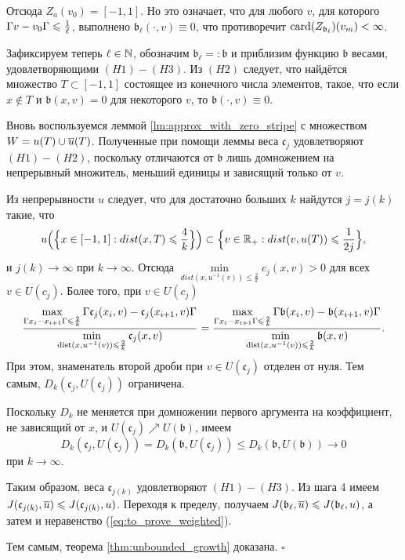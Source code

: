Отсюда $Z_{a}(v_0) = [-1, 1]$.
Но это означает, что для любого $v$, для которого $\abs{v - v_0} \le \frac{1}{\ell}$,
выполнено $\mathfrak b_{\ell}(\cdot, v) \equiv 0$,
что противоречит $\operatorname{card}(Z_{\mathfrak b_{\ell}})(v_m) < \infty$.

Зафиксируем теперь $\ell \in \mathbb N$, обозначим $\mathfrak b_{\ell} =: \mathfrak b$
и приблизим функцию $\mathfrak b$ весами, удовлетворяющими $(H1)-(H3)$.
Из $(H2)$ следует, что найдётся множество $T \subset [-1, 1]$
состоящее из конечного числа элементов, такое, что
если $x \not\in T$ и $\mathfrak b(x, v) = 0$ для некоторого $v$, то $\mathfrak b(\cdot, v) \equiv 0$.

Вновь воспользуемся леммой \ref{lm:approx_with_zero_stripe} с множеством $W = u(T) \cup \mon{u}(T)$.
Полученные при помощи леммы веса $\mathfrak c_j$ удовлетворяют $(H1)-(H2)$,
поскольку отличаются от $\mathfrak b$ лишь домножением на непрерывный множитель,
меньший единицы и зависящий только от $v$.

Из непрерывности $u$ следует, что для достаточно больших $k$ найдутся $j = j(k)$ такие, что
$$
u \Bigl( \Bigl\{ x \in [-1, 1]: dist(x, T) \le \frac{4}{k} \Bigr\} \Bigr) \subset \Bigl\{ v \in \Real_+: dist(v, u(T)) \le \frac{1}{2j} \Bigr\},
$$
и $j(k) \to \infty$ при $k \to \infty$.
Отсюда $\min\limits_{dist(x, u^{-1}(v)) \le \frac{2}{k}} c_j(x, v) > 0$ для всех $v \in U(c_j)$.
Более того, при $v \in U(c_j)$
$$
\frac{\max\limits_{\abs{x_i - x_{i + 1}} \le \frac{2}{k}} \abs{\mathfrak c_j(x_i, v) - \mathfrak c_j(x_{i + 1}, v)}}
{\min\limits_{\dist(x, u^{-1}(v)) \le \frac{2}{k}} \mathfrak c_j(x, v)}
=\frac{\max\limits_{\abs{x_i - x_{i + 1}} \le \frac{2}{k}} \abs{\mathfrak b(x_i, v) - \mathfrak b(x_{i + 1}, v)}}
{\min\limits_{\dist(x, u^{-1}(v)) \le \frac{2}{k}} \mathfrak b(x, v)}.
$$
При этом, знаменатель второй дроби при $v \in U(\mathfrak c_j)$ отделен от нуля.
Тем самым, $D_k(\mathfrak c_j, U(\mathfrak c_j))$ ограничена.

Поскольку $D_k$ не меняется при домножении первого аргумента на коэффициент, не зависящий от $x$,
и $U(\mathfrak c_j) \nearrow U(\mathfrak b)$, имеем
$$
D_k(\mathfrak c_j, U(\mathfrak c_j)) = D_k(\mathfrak b, U(\mathfrak c_j)) \le D_k(\mathfrak b, U(\mathfrak b)) \to 0
$$
при $k \to \infty$.

Таким образом, веса $\mathfrak c_{j(k)}$ удовлетворяют $(H1)-(H3)$.
Из шага 4 имеем $\IWg(\mathfrak c_{j(k)}, \mon{u}) \le \IWg(\mathfrak c_{j(k)}, u)$.
Переходя к пределу, получаем $\IWg(\mathfrak b_{\ell}, \mon{u}) \le \IWg(\mathfrak b_{\ell}, u)$,
а затем и неравенство (\ref{eq:to_prove_weighted}).

Тем самым, теорема \ref{thm:unbounded_growth} доказана.
\hfill $\square$
